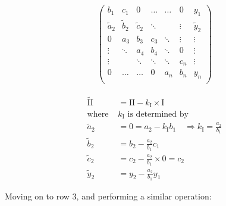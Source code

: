 \documentclass[11pt,a4paper,notitlepage]{article}
\begin{document}
\begin{minipage}{0.5\linewidth}
\begin{align*}
\left(\begin{matrix}
  b_1   & c_1    & 0      & \dots   & \dots  & 0       & y_1     \\
  \tilde{a}_2   & \tilde{b}_2    & \tilde{c}_2    & \ddots  &        & \vdots  & \tilde{y}_2  \\
  0     & a_3    & b_3    & c_3     & \ddots & \vdots  & \vdots  \\
 \vdots & \ddots & a_4    & b_4     & \ddots & 0       & \vdots  \\
 \vdots &        & \ddots & \ddots  & \ddots & c_n     & \vdots  \\
  0     & \dots  & \dots  & 0       & a_{n}  & b_n     & y_{n}   \\
\end{matrix}\right)
\end{align*}
\end{minipage}
\begin{minipage}{0.5\linewidth}
	\begin{align*}
	\tilde{\text{II}} &= \text{II} - k_\text{I} \times \text{I}\\
	\text{where }&k_\text{I} \text{ is determined by}\\
	\tilde{a}_2 &= 0 = a_2 - k_\text{I}b_1 \quad \Rightarrow k_\text{I} = \frac{a_2}{b_1}\\
	\tilde{b}_2 &= b_2 - \frac{a_2}{b_1} c_1 \\
	\tilde{c}_2 &= c_2 - \frac{a_2}{b_1} \times 0 = c_2 \\
	\tilde{y}_2 &= y_2 - \frac{a_2}{b_1} y_1
	\end{align*}
\end{minipage}
Moving on to row 3, and performing a similar operation:
\end{document}
